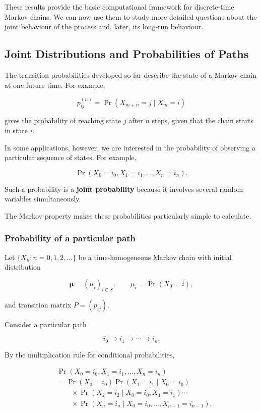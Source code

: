\documentclass[
  letterpaper,
  DIV=11,
  numbers=noendperiod]{scrartcl}
\theoremstyle{definition}
\theoremstyle{remark}
\begin{document}
These results provide the basic computational framework for
discrete-time Markov chains. We can now use them to study more detailed
questions about the joint behaviour of the process and, later, its
long-run behaviour.

\subsection{Joint Distributions and Probabilities of
Paths}\label{joint-distributions-and-probabilities-of-paths}

The transition probabilities developed so far describe the state of a
Markov chain at one future time. For example,

\[
p_{ij}^{(n)}
=
\Pr(X_{m+n}=j\mid X_m=i)
\]

gives the probability of reaching state \(j\) after \(n\) steps, given
that the chain starts in state \(i\).

In some applications, however, we are interested in the probability of
observing a particular sequence of states. For example,

\[
\Pr(X_0=i_0,X_1=i_1,\ldots,X_n=i_n).
\]

Such a probability is a \textbf{joint probability} because it involves
several random variables simultaneously.

The Markov property makes these probabilities particularly simple to
calculate.

\subsubsection{Probability of a particular
path}\label{probability-of-a-particular-path}

Let \(\{X_n:n=0,1,2,\ldots\}\) be a time-homogeneous Markov chain with
initial distribution

\[
\boldsymbol{\mu}
=
(\mu_i)_{i\in S},
\qquad
\mu_i=\Pr(X_0=i),
\]

and transition matrix \(P=(p_{ij})\).

Consider a particular path

\[
i_0\longrightarrow i_1\longrightarrow\cdots\longrightarrow i_n.
\]

By the multiplication rule for conditional probabilities,

\[
\begin{aligned}
&\Pr(X_0=i_0,X_1=i_1,\ldots,X_n=i_n)\\
&=
\Pr(X_0=i_0)
\Pr(X_1=i_1\mid X_0=i_0)\\
&\qquad\times
\Pr(X_2=i_2\mid X_0=i_0,X_1=i_1)
\cdots\\
&\qquad\times
\Pr(X_n=i_n\mid X_0=i_0,\ldots,X_{n-1}=i_{n-1}).
\end{aligned}
\]
\end{document}
